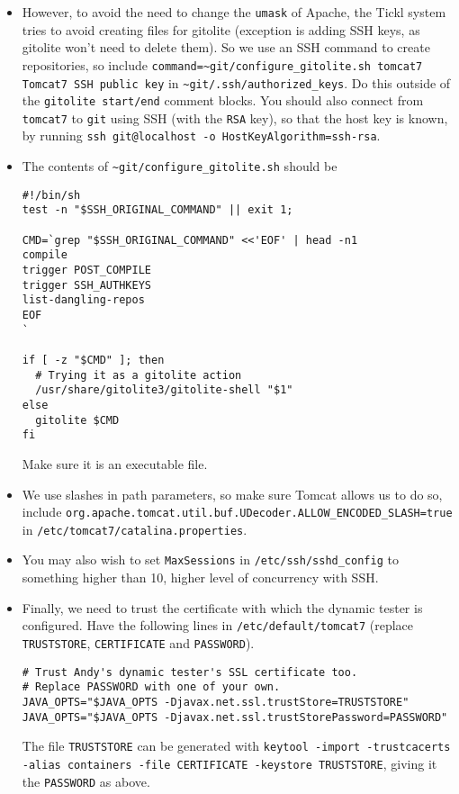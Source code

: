 \documentclass[12pt,a4paper]{article}
\newcommand{\gitoliteAuthkeys}{{\tt \~{}git/\hspace{0pt}.ssh/\hspace{0pt}authorized\_keys}}
\begin{document}
\begin{itemize}
  \item However, to avoid the need to change the {\tt umask} of Apache, the Tickl system tries to avoid creating files for gitolite (exception is adding SSH keys, as gitolite won't need to delete them).
    So we use an SSH command to create repositories, so include {\tt command=\textquotedbl{}\~{}git{}/configure\_gitolite.sh tomcat7\textquotedbl{} Tomcat7 SSH public key} in \gitoliteAuthkeys{}.
    Do this outside of the {\tt gitolite start/end} comment blocks.
    You should also connect from {\tt tomcat7} to {\tt git} using SSH (with the {\tt RSA} key), so that the host key is known, by running {\tt ssh git@localhost -o HostKeyAlgorithm=ssh-rsa}.

  \item The contents of {\tt \~{}git{}/configure\_gitolite.sh} should be
    \begin{verbatim}
#!/bin/sh
test -n "$SSH_ORIGINAL_COMMAND" || exit 1;

CMD=`grep "$SSH_ORIGINAL_COMMAND" <<'EOF' | head -n1
compile
trigger POST_COMPILE
trigger SSH_AUTHKEYS
list-dangling-repos
EOF
`

if [ -z "$CMD" ]; then
  # Trying it as a gitolite action
  /usr/share/gitolite3/gitolite-shell "$1"
else
  gitolite $CMD
fi
    \end{verbatim}
    Make sure it is an executable file.

  \item We use slashes in path parameters, so make sure Tomcat allows us to do so, include {\tt org.apache.tomcat.util.buf.UDecoder.ALLOW\_ENCODED\_SLASH=true} in {\tt /etc/tomcat7/catalina.properties}.
    
  \item You may also wish to set {\tt MaxSessions} in {\tt /etc/ssh/sshd\_config} to something higher than 10, higher level of concurrency with SSH\@.

  \item Finally, we need to trust the certificate with which the dynamic tester is configured.
    Have the following lines in {\tt /etc/default/tomcat7} (replace {\tt TRUSTSTORE}, {\tt CERTIFICATE} and {\tt PASSWORD}).
    \begin{verbatim}
# Trust Andy's dynamic tester's SSL certificate too.
# Replace PASSWORD with one of your own.
JAVA_OPTS="$JAVA_OPTS -Djavax.net.ssl.trustStore=TRUSTSTORE"
JAVA_OPTS="$JAVA_OPTS -Djavax.net.ssl.trustStorePassword=PASSWORD"
    \end{verbatim}

    The file {\tt TRUSTSTORE} can be generated with {\tt keytool -import -trustcacerts -alias containers -file CERTIFICATE -keystore {\tt TRUSTSTORE}}, giving it the {\tt PASSWORD} as above.
\end{itemize}
\end{document}

